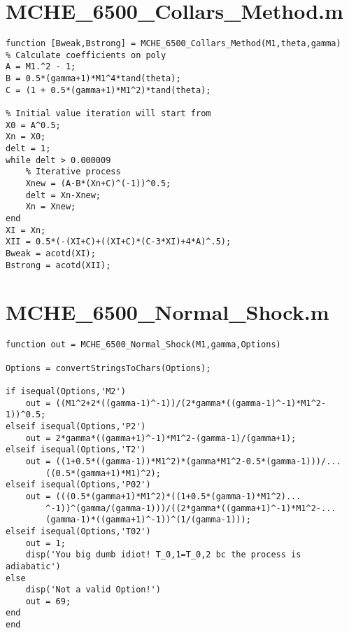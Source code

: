 \documentclass{article}
\begin{document}
\newpage
\section*{MCHE\_6500\_Collars\_Method.m}
\begin{lstlisting}[style=Matlab-editor]
function [Bweak,Bstrong] = MCHE_6500_Collars_Method(M1,theta,gamma)
% Calculate coefficients on poly
A = M1.^2 - 1;
B = 0.5*(gamma+1)*M1^4*tand(theta);
C = (1 + 0.5*(gamma+1)*M1^2)*tand(theta);

% Initial value iteration will start from
X0 = A^0.5;
Xn = X0;
delt = 1;
while delt > 0.000009
    % Iterative process
    Xnew = (A-B*(Xn+C)^(-1))^0.5;
    delt = Xn-Xnew;
    Xn = Xnew;
end
XI = Xn;
XII = 0.5*(-(XI+C)+((XI+C)*(C-3*XI)+4*A)^.5);
Bweak = acotd(XI);
Bstrong = acotd(XII);
\end{lstlisting}

\section*{MCHE\_6500\_Normal\_Shock.m}
\begin{lstlisting}[style=Matlab-editor]
function out = MCHE_6500_Normal_Shock(M1,gamma,Options)

Options = convertStringsToChars(Options);

if isequal(Options,'M2')
    out = ((M1^2+2*((gamma-1)^-1))/(2*gamma*((gamma-1)^-1)*M1^2-1))^0.5;
elseif isequal(Options,'P2')
    out = 2*gamma*((gamma+1)^-1)*M1^2-(gamma-1)/(gamma+1);
elseif isequal(Options,'T2')
    out = ((1+0.5*((gamma-1))*M1^2)*(gamma*M1^2-0.5*(gamma-1)))/...
        ((0.5*(gamma+1)*M1)^2);
elseif isequal(Options,'P02')
    out = (((0.5*(gamma+1)*M1^2)*((1+0.5*(gamma-1)*M1^2)...
        ^-1))^(gamma/(gamma-1)))/((2*gamma*((gamma+1)^-1)*M1^2-...
        (gamma-1)*((gamma+1)^-1))^(1/(gamma-1)));
elseif isequal(Options,'T02')
    out = 1;
    disp('You big dumb idiot! T_0,1=T_0,2 bc the process is adiabatic')
else
    disp('Not a valid Option!')
    out = 69;
end
end
\end{lstlisting}

\newpage
\end{document}
